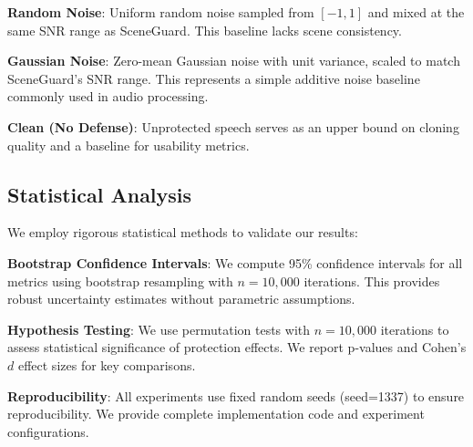 \textbf{Random Noise}: Uniform random noise sampled from $[-1, 1]$ and mixed at the same SNR range as SceneGuard. This baseline lacks scene consistency.

\textbf{Gaussian Noise}: Zero-mean Gaussian noise with unit variance, scaled to match SceneGuard's SNR range. This represents a simple additive noise baseline commonly used in audio processing.

\textbf{Clean (No Defense)}: Unprotected speech serves as an upper bound on cloning quality and a baseline for usability metrics.

\subsection{Statistical Analysis}

We employ rigorous statistical methods to validate our results:

\textbf{Bootstrap Confidence Intervals}: We compute 95\% confidence intervals for all metrics using bootstrap resampling with $n=10,000$ iterations. This provides robust uncertainty estimates without parametric assumptions.

\textbf{Hypothesis Testing}: We use permutation tests with $n=10,000$ iterations to assess statistical significance of protection effects. We report p-values and Cohen's $d$ effect sizes for key comparisons.

\textbf{Reproducibility}: All experiments use fixed random seeds (seed=1337) to ensure reproducibility. We provide complete implementation code and experiment configurations.

